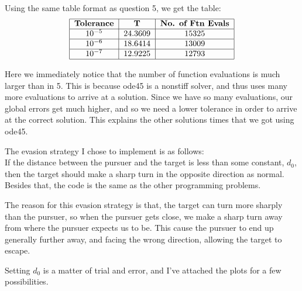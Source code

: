 \documentclass[12pt]{article}
\begin{document}
\begin{list}{.}{}
\item Using the same table format as question 5, we get the table:
\[
\begin{tabular}{|c|c|c|}
\hline
\textbf{Tolerance} & \textbf{T} & \textbf{No. of Ftn Evals}\\ \hline
$10^{-5}$ & 24.3609 & 15325\\ \hline
$10^{-6}$ & 18.6414 & 13009\\ \hline
$10^{-7}$ & 12.9225 & 12793\\ \hline
\end{tabular}
\]

Here we immediately notice that the number of function evaluations is much
larger than in 5.  This is because ode45 is a nonstiff solver, and thus uses
many more evaluations to arrive at a solution.  Since we have so many
evaluations, our global errors get much higher, and so we need a lower tolerance
in order to arrive at the correct solution.  This explains the other solutions
times that we got using ode45.

\item The evasion strategy I chose to implement is as follows:\\
If the distance between the pursuer and the target is less than some constant,
$d_0$, then the target should make a sharp turn in the opposite direction as
normal.  Besides that, the code is the same as the other programming problems.

The reason for this evasion strategy is that, the target can turn more sharply
than the pursuer, so when the pursuer gets close, we make a sharp turn away from
where the pursuer expects us to be.  This cause the pursuer to end up generally
further away, and facing the wrong direction, allowing the target to escape.

Setting $d_0$ is a matter of trial and error, and I've attached the plots for a
few possibilities.

\end{list}
\end{document}
